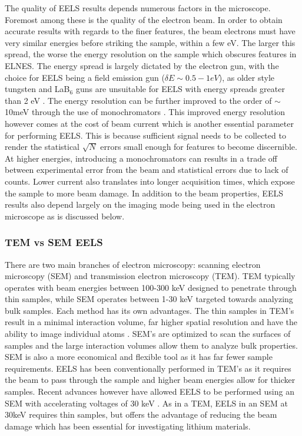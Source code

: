The quality of EELS results depends numerous factors in the microscope.  Foremost among these is the quality of the electron beam.  In order to obtain accurate results with regards to the finer features, the beam electrons must have very similar energies before striking the sample, within a few eV.  The larger this spread, the worse the energy resolution on the sample which obscures features in ELNES.  The energy spread is largely dictated by the electron gun, with the choice for EELS being a field emission gun ($\delta E \sim 0.5-1eV$), as older style tungsten and LaB$_6$ guns are unsuitable for EELS with energy spreads greater than 2 eV \cite{reimer_transmission_2008}.  The energy resolution can be further improved to the order of $\sim$10meV through the use of monochromators \cite{hachtel_exploring_2018}.  This improved energy resolution however comes at the cost of beam current which is another essential parameter for performing EELS.  This is because sufficient signal needs to be collected to render the statistical $\sqrt{N}$ errors small enough for features to become discernible.  At higher energies, introducing a monochromators can results in a trade off between experimental error from the beam and statistical errors due to lack of counts.  Lower current also translates into longer acquisition times, which expose the sample to more beam damage.  In addition to the beam properties, EELS results also depend largely on the imaging mode being used in the electron microscope as is discussed below.


\subsubsection{TEM vs SEM EELS}
There are two main branches of electron microscopy: scanning electron microscopy (SEM) and transmission electron microscopy (TEM).  TEM typically operates with beam energies between 100-300 keV designed to penetrate through thin samples, while SEM operates between 1-30 keV targeted towards analyzing bulk samples.  Each method has its own advantages.  The thin samples in TEM's result in a minimal interaction volume, far higher spatial resolution and have the ability to image individual atoms \cite{hansen_atomic-resolution_2001}. SEM's are optimized to scan the surfaces of samples and the large interaction volumes allow them to analyze bulk properties.  SEM is also a more economical and flexible tool as it has far fewer sample requirements.   EELS has been conventionally performed in TEM's as it requires the beam to pass through the sample and higher beam energies allow for thicker samples. Recent advances however have allowed EELS to be performed using an SEM with accelerating voltages of 30 keV \cite{SU_9000}.  As in a TEM, EELS in an SEM at 30keV requires thin samples, but offers the advantage of reducing the beam damage which has been essential for investigating lithium materials. 



